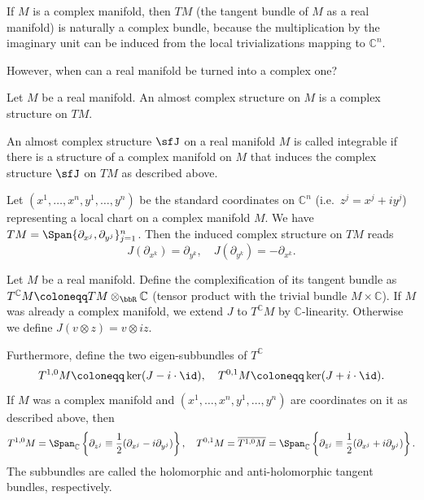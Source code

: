 If $M$ is a complex manifold, then $TM$ (the tangent bundle of $M$ as a real manifold) is naturally a complex bundle, because the multiplication by the imaginary unit can be induced from the local trivializations mapping to $\mathbb{C}^n$.

However, when can a real manifold be turned into a complex one?

\begin{defn}
    Let $M$ be a real manifold. An almost complex structure on $M$ is a complex structure on $TM$.
\end{defn}

\begin{defn}
    An almost complex structure $\sfJ$ on a real manifold $M$ is called integrable if there is a structure of a complex manifold on $M$ that induces the complex structure $\sfJ$ on $TM$ as described above.
\end{defn}

Let $(x^1,\ldots,x^n,y^1,\ldots,y^n)$ be the standard coordinates on $\mathbb{C}^n$ (i.e.\ $z^j=x^j+iy^j$) representing a local chart on a complex manifold $M$. We have $TM=\Span\{\partial_{x^j},\partial_{y^j}\}_{j=1}^n$. Then the induced complex structure on $TM$ reads 
\[J(\partial_{x^k})=\partial_{y^k},\quad J(\partial_{y^k})=-\partial_{x^k}.\]

\begin{defn}
    Let $M$ be a real manifold. Define the complexification of its tangent bundle as $T^\mathbb{C} M\coloneqq TM\otimes_\bbR \mathbb{C}$ (tensor product with the trivial bundle $M\times \mathbb{C}$). If $M$ was already a complex manifold, we extend $J$ to $T^\mathbb{C} M$ by $\mathbb{C}$-linearity. Otherwise we define $J(v\otimes z)=v\otimes iz$.
    
    Furthermore, define the two eigen-subbundles of $T^\mathbb{C}$
    \[T^{1,0}M\coloneqq \ker(J-i\cdot \id),\quad T^{0,1}M\coloneqq\ker(J+i\cdot\id).\]
    If $M$ was a complex manifold and $(x^1,\ldots,x^n,y^1,\ldots,y^n)$ are coordinates on it as described above, then 
    \[T^{1,0}M=\Span_\mathbb{C}\left\{\partial_{z^j}\equiv \frac12(\partial_{x^j}-i\partial_{y^j})\right\},\quad T^{0,1}M=\overline{T^{1,0}M}=\Span_\mathbb{C}\left\{\partial_{\bar z^j}\equiv \frac12(\partial_{x^j}+i\partial_{y^j})\right\}.\]
    The subbundles are called the holomorphic and anti-holomorphic tangent bundles, respectively.
\end{defn}

